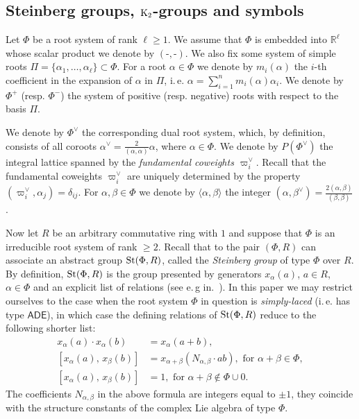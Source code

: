 \subsection{Steinberg groups, $\operatorname{K}_2$-groups and symbols}\label{subsec:steinberg-preliminaries}
Let $\Phi$ be a root system of rank $\ell \geq 1$.
We assume that $\Phi$ is embedded into $\mathbb{R}^\ell$ whose scalar product we denote by $(\text{-}, \text{-})$.
We also fix some system of simple roots $\Pi = \{\alpha_1, \ldots, \alpha_\ell\} \subset \Phi$.
For a root $\alpha\in\Phi$ we denote by $m_i(\alpha)$ the $i$-th coefficient in the expansion of $\alpha$ in $\Pi$,
i.\,e. $\alpha = \sum_{i=1}^n m_i(\alpha) \alpha_i$.
We denote by $\Phi^+$ (resp. $\Phi^-$) the system of positive (resp. negative) roots with respect to the basis $\Pi$.

We denote by $\Phi^\vee$ the corresponding dual root system, which, by definition, consists of all coroots $\alpha^\vee = \frac{2}{(\alpha, \alpha)} \alpha$, where $\alpha \in \Phi$.
We denote by $P(\Phi^\vee)$ the integral lattice spanned by the \emph{fundamental coweights $\varpi_i^\vee$}.
Recall that the fundamental coweights $\varpi_i^\vee$ are uniquely determined by the property $(\varpi_i^\vee, \alpha_j) = \delta_{ij}$.
For $\alpha,\beta \in \Phi$ we denote by $\langle \alpha, \beta \rangle$ the integer $(\alpha, \beta^\vee) = \frac{2(\alpha, \beta)}{(\beta, \beta)}$.

Now let $R$ be an arbitrary commutative ring with $1$ and suppose that $\Phi$ is an irreducible root system of rank $\geq 2$.
Recall that to the pair $(\Phi, R)$ can associate an abstract group $\operatorname{St}(\Phi, R)$, called the \textit{Steinberg group} of type $\Phi$ over $R$.
By definition, $\operatorname{St}(\Phi, R)$ is the group presented by generators $x_\alpha(a)$, $a \in R$, $\alpha \in \Phi$ and an explicit list of relations (see e.\,g in.~\cite{Ma69, Re75, St71}).
In this paper we may restrict ourselves to the case when the root system $\Phi$ in question is \textit{simply-laced} (i.\,e. has type $\mathsf{ADE}$),
 in which case the defining relations of $\operatorname{St}(\Phi, R)$ reduce to the following shorter list:
\begin{align}
x_{\alpha}(a)\cdot x_{\alpha}(b)&=x_{\alpha}(a+b), \tag{R1} \label{x-additivity}\\
[x_{\alpha}(a),\,x_{\beta}(b)]  &=x_{\alpha+\beta}(N_{\alpha,\beta} \cdot ab),\text{ for }\alpha+\beta\in\Phi, \tag{R2} \label{R2} \\
[x_{\alpha}(a),\,x_{\beta}(b)]  &=1,\text{ for }\alpha+\beta\not\in\Phi\cup0. \tag{R3} \label{R3}
\end{align}
The coefficients $N_{\alpha,\beta}$ in the above formula are integers equal to $\pm 1$, they coincide with the structure constants of the complex Lie algebra of type $\Phi$.

